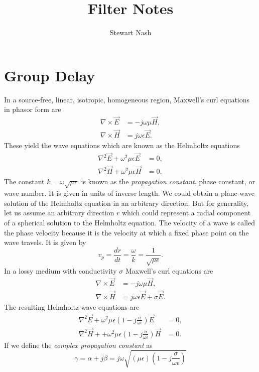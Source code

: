 \documentclass{article}
\begin{document}
	\title{Filter Notes}
	\author{Stewart Nash}

	\maketitle
	\section{Group Delay}
In a source-free, linear, isotropic, homogeneous region, Maxwell's curl equations in phasor form are
\begin{align}
	\nabla\times\vec{E}&=-j\omega\mu\vec{H},\\
	\nabla\times\vec{H}&=j\omega\epsilon\vec{E}.
\end{align}
These yield the wave equations which are known as the Helmholtz equations
\begin{align}
	\nabla^2\vec{E}+\omega^2\mu\epsilon\vec{E}&=0,\\
	\nabla^2\vec{H}+\omega^2\mu\epsilon\vec{H}&=0.
\end{align}
The constant $k=\omega\sqrt{\mu\epsilon}$ is known as the \emph{propagation constant}, phase constant, or wave number. It is given in units of inverse length.
We could obtain a plane-wave solution of the Helmholtz equation in an arbitrary direction. But for generality, let us assume an arbitrary direction $r$ which could represent a radial component of a spherical solution to the Helmholtz equation. The velocity of a wave is called the phase velocity because it is the velocity at which a fixed phase point on the wave travels. It is given by
\begin{equation}
	v_p=\frac{dr}{dt}=\frac{\omega}{k}=\frac{1}{\sqrt{\mu\epsilon}}.
\end{equation}
In a lossy medium with conductivity $\sigma$ Maxwell's curl equations are
\begin{align}
	\nabla\times\vec{E}&=-j\omega\mu\vec{H},\\
	\nabla\times\vec{H}&=j\omega\epsilon\vec{E}+\sigma\vec{E}.
\end{align}
The resulting Helmholtz wave equations are
\begin{align}
	\nabla^2\vec{E}+\omega^2\mu\epsilon\left(1-j\frac{\sigma}{\omega\epsilon}\right)\vec{E}&=0,\\
	\nabla^2\vec{H}++\omega^2\mu\epsilon\left(1-j\frac{\sigma}{\omega\epsilon}\right)\vec{H}&=0.
\end{align}
If we define the \emph{complex propagation constant} as
\begin{equation}
	\gamma=\alpha+j\beta=j\omega\sqrt{(\mu\epsilon)\left(1-j\frac{\sigma}{\omega\epsilon}\right)}
\end{equation}
\end{document}
